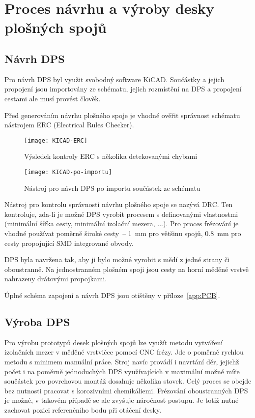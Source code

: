 \section{Proces návrhu a výroby desky plošných spojů}
\subsection{Návrh DPS}
Pro návrh DPS byl využit svobodný software KiCAD. Součástky a jejich propojení
jsou importovány ze schématu, jejich rozmístění na DPS a propojení cestami ale
musí provést člověk.

Před generováním návrhu plošného spoje je vhodné ověřit správnost schématu
nástrojem ERC (Electrical Rules Checker).

\begin{figure}[htbp]
    \centering
    \texttt{[image: KICAD-ERC]}
    \caption{Výsledek kontroly ERC s několika detekovanými chybami}
    \label{fig:kicad ERC}
\end{figure}

\begin{figure}[htbp]
    \centering
    \texttt{[image: KICAD-po-importu]}
    \caption{%
        Nástroj pro návrh DPS  po importu součástek ze
        schématu
    }
    \label{fig:kicad po importu}
\end{figure}

Nástroj pro kontrolu správnosti návrhu plošného spoje se nazývá DRC. Ten
kontroluje, zda-li je možné DPS vyrobit procesem s definovanými vlastnostmi
(minimální šířka cesty, minimální izolační mezera, ...). Pro proces frézování
je vhodné používat poměrně široké cesty~-- \SI{1}{\milli\meter} pro většinu
spojů, \SI{0,8}{\milli\meter} pro cesty propojující SMD integrované obvody.

DPS byla navržena tak, aby ji bylo možné vyrobit s mědí z jedné strany či
oboustranně. Na jednostranném plošném spoji jsou cesty na horní měděné vrstvě
nahrazeny drátovými propojkami.

Úplné schéma zapojení a návrh DPS jsou otištěny v příloze~\ref{app:PCB}.


\subsection{Výroba DPS}
Pro výrobu prototypů desek plošných spojů lze využít metodu vytváření
izolačních mezer v měděné vrstvičce pomocí CNC frézy. Jde o poměrně rychlou
metodu s minimem manuální práce. Stroj navíc provádí i navrtání děr, jejichž
počet i na poměrně jednoduchých DPS využívajících v maximální možné míře
součástek pro povrchovou montáž dosahuje několika stovek. Celý proces se obejde
bez nutnosti pracovat s korozivními chemikáliemi. Frézování oboustranných DPS
je možné, v takovém případě se ale zvyšuje náročnost postupu. Je totiž nutné
zachovat pozici referenčního bodu při otáčení desky.

